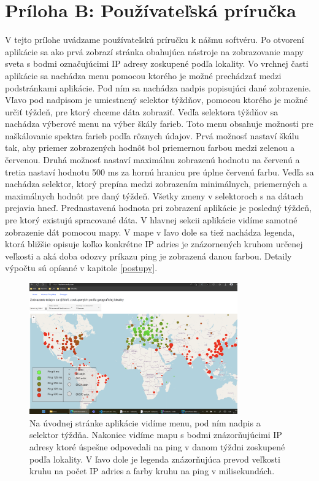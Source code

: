 \chapter*{Príloha B: Používateľská príručka}

V tejto prílohe uvádzame používateľskú príručku k nášmu softvéru. Po otvorení aplikácie sa ako prvá zobrazí stránka obahujúca nástroje na 
zobrazovanie mapy sveta s bodmi označujúcimi IP adresy zoskupené podľa lokality. Vo vrchnej časti aplikácie sa nachádza menu pomocou 
ktorého je možné prechádzať medzi podstránkami aplikácie. Pod ním sa nachádza nadpis popisujúci dané zobrazenie. Vľavo pod nadpisom je umiestnený 
selektor týždňov, pomocou ktorého je možné určiť týždeň, pre ktorý chceme dáta zobraziť. 
Vedľa selektora týždňov sa nachádza výberové menu na výber škály farieb. Toto menu obsahuje možnosti pre naškálovanie spektra farieb podľa rôznych údajov.
Prvá možnosť nastaví škálu tak, aby priemer zobrazených hodnôt bol priemernou farbou medzi zelenou a červenou. Druhá možnosť nastaví maximálnu zobrazenú hodnotu 
na červenú a tretia nastaví hodnotu 500 ms za hornú hranicu pre úplne červenú farbu. Vedľa sa nachádza selektor, ktorý prepína medzi zobrazením minimálnych,
priemerných a maximálnych hodnôt pre daný týždeň. Všetky zmeny v selektoroch s na dátach prejavia hneď.
Prednastavená hodnota pri zobrazení aplikácie je posledný týždeň, pre ktorý existujú spracované dáta. V hlavnej sekcii aplikácie vidíme samotné 
zobrazenie dát pomocou mapy. V mape v ľavo dole sa tiež nachádza legenda, ktorá bližšie opisuje koľko konkrétne IP adries je znázornených kruhom 
určenej veľkosti a aká doba odozvy príkazu ping je zobrazená danou farbou. Detaily výpočtu sú opísané v kapitole \ref{postupy}. 

\begin{figure}
    \centerline{\includegraphics[width=0.8\textwidth]{images/uvodna_stranka}}
    \caption[Úvodná strana s mapou]{Na úvodnej stránke aplikácie vidíme menu, pod ním nadpis a selektor týždňa. Nakoniec vidíme mapu s bodmi 
    znázorňujúcimi IP adresy ktoré úspešne odpovedali na ping v danom týždni zoskupené podľa lokality. V ľavo dole je legenda znázorňujúca prevod veľkosti
    kruhu na počet IP adries a farby kruhu na ping v milisekundách.}
    \label{obr:map_points}
\end{figure}

